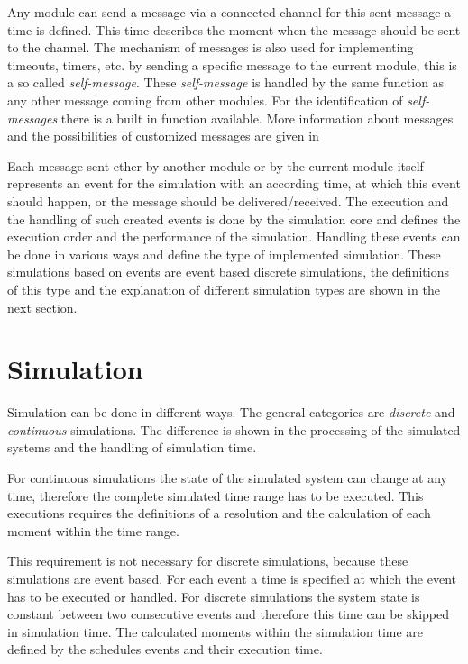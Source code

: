 \documentclass[journal]{IEEEtran}
\begin{document}
Any module can send a message via a connected channel for this sent message a time is defined.
This time describes the moment when the message should be sent to the channel.
The mechanism of messages is also used for implementing timeouts, timers, etc. by sending a specific message to the current module, this is a so called \emph{self-message}.
These \emph{self-message} is handled by the same function as any other message coming from other modules.
For the identification of \emph{self-messages} there is a built in function available.
More information about messages and the possibilities of customized messages are given in \cite[chapter 5]{OMNETMANUAL}

Each message sent ether by another module or by the current module itself represents an event for the simulation with an according time, at which this event should happen, or the message should be delivered/received.
The execution and the handling of such created events is done by the simulation core and defines the execution order and the performance of the simulation.
Handling these events can be done in various ways and define the type of implemented simulation.
These simulations based on events are event based discrete simulations, the definitions of this type and the explanation of different simulation types are shown in the next section.

\section{Simulation}
\label{sec:Simulation}
Simulation can be done in different ways. The general categories are \emph{discrete} and \emph{continuous} simulations.
The difference is shown in the processing of the simulated systems and the handling of simulation time.

For continuous simulations the state of the simulated system can change at any time, therefore the complete simulated time range has to be executed.
This executions requires the definitions of a resolution and the calculation of each moment within the time range.

This requirement is not necessary for discrete simulations, because these simulations are event based.
For each event a time is specified at which the event has to be executed or handled.
For discrete simulations the system state is constant between two consecutive events and therefore this time can be skipped in simulation time.
The calculated moments within the simulation time are defined by the schedules events and their execution time.
\end{document}
